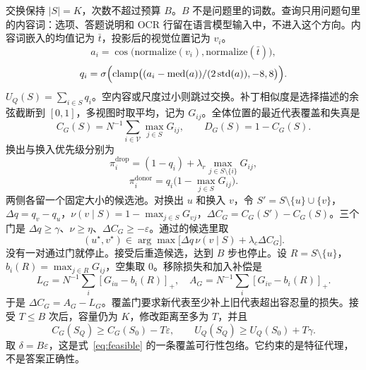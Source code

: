 交换保持 $|S|=K$，次数不超过预算 $B$。$B$ 不是问题里的词数。查询只用问题句里的内容词：选项、答题说明和 OCR 行留在语言模型输入中，不进入这个方向。内容词嵌入的均值记为 $\bar t$，投影后的视觉位置记为 $v_i$。
\begin{equation}
a_i=\cos\bigl(\mathrm{normalize}(v_i),\mathrm{normalize}(\bar t)\bigr),
\label{eq:araw}
\end{equation}
\begin{equation}
q_i=\sigma\Bigl(\mathrm{clamp}\bigl((a_i-\mathrm{med}(a))/(2\,\mathrm{std}(a)),-8,8\bigr)\Bigr).
\label{eq:q}
\end{equation}
$U_Q(S)=\sum_{i\in S}q_i$。空内容或尺度过小则跳过交换。补丁相似度是选择描述的余弦截断到 $[0,1]$，多视图时取平均，记为 $G_{ij}$。全体位置的最近代表覆盖和失真是
\begin{equation}
C_G(S)=N^{-1}\sum_{i\in\mathcal{V}}\max_{j\in S}G_{ij},\qquad D_G(S)=1-C_G(S).
\label{eq:cov}
\end{equation}
换出与换入优先级分别为
\begin{equation}
\pi_i^{\mathrm{drop}}=(1-q_i)+\lambda_r\max_{j\in S\setminus\{i\}}G_{ij},
\label{eq:drop}
\end{equation}
\begin{equation}
\pi_i^{\mathrm{donor}}=q_i\bigl(1-\max_{j\in S}G_{ij}\bigr).
\label{eq:donor}
\end{equation}
两侧各留一个固定大小的候选池。对换出 $u$ 和换入 $v$，令 $S'=S\setminus\{u\}\cup\{v\}$，$\Delta q=q_v-q_u$，$\nu(v\mid S)=1-\max_{j\in S}G_{vj}$，$\Delta C_G=C_G(S')-C_G(S)$。三个门是 $\Delta q\ge\gamma$、$\nu\ge\eta$、$\Delta C_G\ge-\varepsilon$。通过的候选里取
\begin{equation}
(u^\star,v^\star)\in\arg\max\bigl[\Delta q\,\nu(v\mid S)+\lambda_c\Delta C_G\bigr].
\label{eq:swap}
\end{equation}
没有一对通过门就停止。接受后重造候选，达到 $B$ 步也停止。设 $R=S\setminus\{u\}$，$b_i(R)=\max_{j\in R}G_{ij}$，空集取 $0$。移除损失和加入补偿是
\begin{equation}
L_G=N^{-1}\sum_i[G_{iu}-b_i(R)]_{+},\quad A_G=N^{-1}\sum_i[G_{iv}-b_i(R)]_{+}.
\label{eq:decomp}
\end{equation}
于是 $\Delta C_G=A_G-L_G$。覆盖门要求新代表至少补上旧代表超出容忍量的损失。接受 $T\le B$ 次后，容量仍为 $K$，修改距离至多为 $T$，并且
\begin{equation}
C_G(S_Q)\ge C_G(S_0)-T\varepsilon,\qquad U_Q(S_Q)\ge U_Q(S_0)+T\gamma.
\label{eq:envelope}
\end{equation}
取 $\delta=B\varepsilon$，这是式~\eqref{eq:feasible} 的一条覆盖可行性包络。它约束的是特征代理，不是答案正确性。

